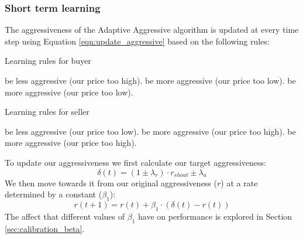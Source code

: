 \documentclass[preprint]{acm_proc_article-sp} %
\begin{document}
\subsubsection{Short term learning} \label{sec:AA_short_term_learning}
The aggressiveness of the Adaptive Aggressive algorithm is updated at every
time step using Equation \ref{eqn:update_aggressive} based on the following rules:

\begin{algorithm}[H]
  \caption{Learning rules for buyer}
  \begin{algorithmic}
            \STATE be less aggressive (our price too high).
        \ELSE
            \STATE be more aggressive (our price too low).
        \ENDIF
        \STATE be more aggressive (our price too low).
    \ENDIF
  \end{algorithmic}
  \label{alg:learning_rules_buyer}
\end{algorithm}

\begin{algorithm}[H]
  \caption{Learning rules for seller}
  \begin{algorithmic}
            \STATE be less aggressive (our price too low).
        \ELSE
            \STATE be more aggressive (our price too high).
        \ENDIF
        \STATE be more aggressive (our price too high).
    \ENDIF
  \end{algorithmic}
  \label{alg:learning_rules_seller}
\end{algorithm}

To update our aggressiveness we first calculate our target aggressiveness:
\begin{equation}
    \delta(t) = (1 \pm \lambda_r) \cdot r_{shout} \pm \lambda_a
\end{equation}
We then move towards it from our original aggressiveness ($r$) at 
a rate determined by a constant ($\beta_1$):
\begin{equation}
    r(t+1) = r(t) + \beta_1 \cdot (\delta(t) - r(t))
  \label{eqn:update_aggressive}
\end{equation}
The affect that different values of $\beta_1$ have on performance is explored in Section \ref{sec:calibration_beta}.
\end{document}
